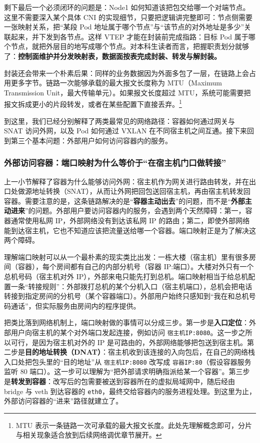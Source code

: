剩下最后一个必须闭环的问题是：Node1 如何知道该把包交给哪一个对端节点。这里不需要深入某个具体 CNI 的实现细节，只要把逻辑讲完整即可：节点侧需要一张映射关系，把“某段 Pod 地址属于哪个节点”与“该节点的对外地址是多少”关联起来，并下发到各节点。这样 VTEP 才能在封装前完成指路：目标 Pod 属于哪个节点，就把外层目的地写成哪个节点。对本科生读者而言，把握职责划分就够了：\textbf{控制面维护并分发映射表，数据面按表完成封装、转发与解封装。}

封装还会带来一个朴素后果：同样的业务数据因为外面多包了一层，在链路上会占用更多字节。链路一次能够承载的最大报文长度称为 MTU（Maximum Transmission Unit，最大传输单元）。如果报文长度超过 MTU，系统可能需要把报文拆成更小的片段转发，或者在某些配置下直接丢弃。\footnote{MTU 表示一条链路一次可承载的最大报文长度。此处先理解概念即可，分片与相关现象适合放到后续网络调优章节展开。}

到这里，我们已经分别解释了两类最常见的网络路径：容器如何通过网关与 SNAT 访问外网，以及 Pod 如何通过 VXLAN 在不同宿主机之间互通。接下来回到第三个基本问题：外部用户如何访问容器内的服务。
\subsubsection{外部访问容器：端口映射为什么等价于“在宿主机门口做转接”}

上一小节解释了容器为什么能够访问外网：宿主机作为网关进行路由转发，并在出口处做源地址转换（SNAT），从而让外网把回包送回宿主机，再由宿主机转发回容器。需要注意的是，这条链路解决的是“\textbf{容器主动出去}”的问题，而不是“\textbf{外部主动进来}”的问题。外部用户要访问容器内的服务，会遇到两个天然障碍：第一，容器通常使用私网 IP，外部网络没有到达该私网 IP 的路由；第二，即使外部网络能到达宿主机，它也不知道应该把流量送给哪一个容器。端口映射正是为了解决这两个障碍。

理解端口映射可以从一个最朴素的现实类比出发：一栋大楼（宿主机）里有很多房间（容器），每个房间都有自己的内部分机号（容器 IP:端口）。大楼对外只有一个总机号码（宿主机对外 IP），外部来电只能先打到总机。端口映射相当于给总机配置一条“转接规则”：外部拨打总机的某个分机入口（宿主机端口），总机会把电话转接到指定房间的分机号（某个容器端口）。外部用户始终只感知到“我在和总机号码通话”，但实际服务由房间内的程序提供。

把类比落到网络机制上，端口映射做的事情可以分成三步。第一步是\textbf{入口定位}：外部用户向宿主机的某个对外端口发起连接，例如访问 \texttt{宿主机IP:8080}。这一步之所以可行，是因为宿主机对外的 IP 是可路由的，外部网络能够把包送到宿主机。第二步是\textbf{目的地址转换（DNAT）}：宿主机收到该连接的入向包后，在自己的网络栈入口处把包头里的“目的地址”从 \texttt{宿主机IP:8080} 改写成 \texttt{容器IP:80}（假设容器服务监听 80 端口）。这一步可以理解为“把外部请求明确指派给某一个容器”。第三步是\textbf{转发到容器}：改写后的包需要被送到容器所在的虚拟局域网中，随后经由 bridge 与 veth 到达容器的 \texttt{eth0}，最终交给容器内的服务进程处理。到这里为止，外部访问容器的“进来”路径就建立了。

